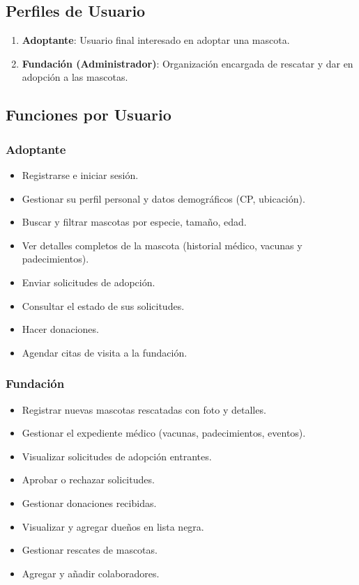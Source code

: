 \documentclass[12pt,a4paper]{article}
\begin{document}
\subsection{Perfiles de Usuario}
\begin{enumerate}
    \item \textbf{Adoptante}: Usuario final interesado en adoptar una mascota.
    \item \textbf{Fundación (Administrador)}: Organización encargada de rescatar y dar en adopción a las mascotas.
\end{enumerate}

\subsection{Funciones por Usuario}
\subsubsection{Adoptante}
\begin{itemize}
    \item Registrarse e iniciar sesión.
    \item Gestionar su perfil personal y datos demográficos (CP, ubicación).
    \item Buscar y filtrar mascotas por especie, tamaño, edad.
    \item Ver detalles completos de la mascota (historial médico, vacunas y padecimientos).
    \item Enviar solicitudes de adopción.
    \item Consultar el estado de sus solicitudes.
    \item Hacer donaciones.
    \item Agendar citas de visita a la fundación.
\end{itemize}
\subsubsection{Fundación}
\begin{itemize}
    \item Registrar nuevas mascotas rescatadas con foto y detalles.
    \item Gestionar el expediente médico (vacunas, padecimientos, eventos).
    \item Visualizar solicitudes de adopción entrantes.
    \item Aprobar o rechazar solicitudes.
    \item Gestionar donaciones recibidas.
    \item Visualizar y agregar dueños en lista negra.
    \item Gestionar rescates de mascotas.
    \item Agregar y añadir colaboradores.
\end{itemize}
\end{document}
